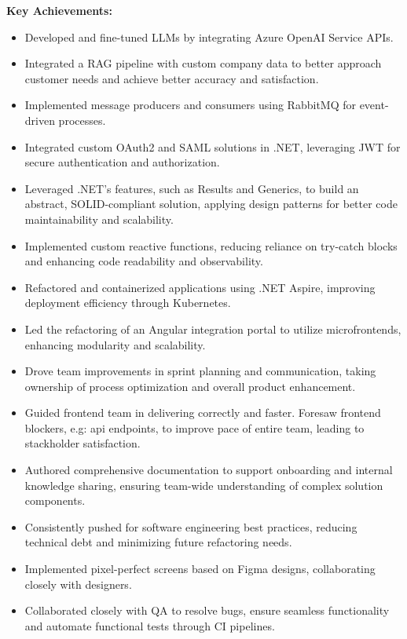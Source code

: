 \documentclass[10pt,a4paper]{altacv}
\begin{document}
\textbf{Key Achievements:} 
\begin{itemize} 
\setlength{\itemindent}{0.5em} 
\item[--] Developed and fine-tuned LLMs by integrating Azure OpenAI Service APIs.
\item[--] Integrated a RAG pipeline with custom company data to better approach customer needs and achieve better accuracy and satisfaction.
\item[--] Implemented message producers and consumers using RabbitMQ for event-driven processes. 
\item[--] Integrated custom OAuth2 and SAML solutions in .NET, leveraging JWT for secure authentication and authorization. 
\item[--] Leveraged .NET’s features, such as Results and Generics, to build an abstract, SOLID-compliant solution, applying design patterns for better code maintainability and scalability. 
\item[--] Implemented custom reactive functions, reducing reliance on try-catch blocks and enhancing code readability and observability.  
\item[--] Refactored and containerized applications using .NET Aspire, improving deployment efficiency through Kubernetes. 
\item[--] Led the refactoring of an Angular integration portal to utilize microfrontends, enhancing modularity and scalability. 
\item[--] Drove team improvements in sprint planning and communication, taking ownership of process optimization and overall product enhancement.
\item[--] Guided frontend team in delivering correctly and faster. Foresaw frontend blockers, e.g: api endpoints, to improve pace of entire team, leading to stackholder satisfaction.
\item[--] Authored comprehensive documentation to support onboarding and internal knowledge sharing, ensuring team-wide understanding of complex solution components.
\item[--] Consistently pushed for software engineering best practices, reducing technical debt and minimizing future refactoring needs.
\item[--] Implemented pixel-perfect screens based on Figma designs, collaborating closely with designers.
\item[--] Collaborated closely with QA to resolve bugs, ensure seamless functionality and automate functional tests through CI pipelines.  
\end{itemize}
\end{document}
